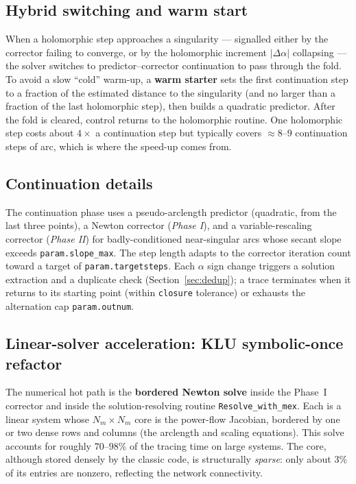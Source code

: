 \documentclass[11pt,a4paper]{article}
\newcommand{\code}[1]{\texttt{#1}}
\begin{document}
\subsection{Hybrid switching and warm start}
When a holomorphic step approaches a singularity --- signalled either by the corrector
failing to converge, or by the holomorphic increment $|\Delta\alpha|$ collapsing --- the
solver switches to predictor--corrector continuation to pass through the fold. To avoid a
slow ``cold'' warm-up, a \textbf{warm starter} sets the first continuation step to a
fraction of the estimated distance to the singularity (and no larger than a fraction of
the last holomorphic step), then builds a quadratic predictor. After the fold is cleared,
control returns to the holomorphic routine. One holomorphic step costs about
$4\times$ a continuation step but typically covers $\approx 8$--$9$ continuation steps of
arc, which is where the speed-up comes from.

\subsection{Continuation details}
The continuation phase uses a pseudo-arclength predictor (quadratic, from the last three
points), a Newton corrector (\emph{Phase I}), and a variable-rescaling corrector
(\emph{Phase II}) for badly-conditioned near-singular arcs whose secant slope exceeds
\code{param.slope_max}. The step length adapts to the corrector iteration count toward a
target of \code{param.targetsteps}. Each $\alpha$ sign change triggers a solution
extraction and a duplicate check (Section~\ref{sec:dedup}); a trace terminates when it returns to its starting
point (within \code{closure} tolerance) or exhausts the alternation cap
\code{param.outnum}.

\subsection{Linear-solver acceleration: KLU symbolic-once refactor}\label{sec:klu}
The numerical hot path is the \textbf{bordered Newton solve} inside the Phase~I corrector
and inside the solution-resolving routine \code{Resolve_with_mex}. Each is a linear system
whose $N_m\times N_m$ core is the power-flow Jacobian, bordered by one or two dense rows and
columns (the arclength and scaling equations). This solve accounts for roughly
$70$--$98\%$ of the tracing time on large systems. The core, although stored densely by the
classic code, is structurally \emph{sparse}: only about $3\%$ of its entries are nonzero,
reflecting the network connectivity.
\end{document}
